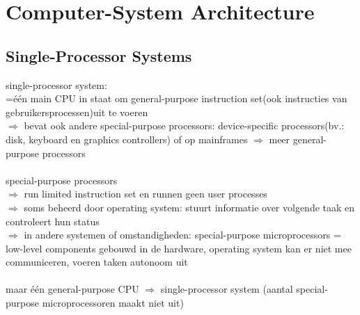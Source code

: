 \documentclass{report}
\begin{document}
\section{Computer-System Architecture}
\subsection{Single-Processor Systems}
single-processor system:
\\=\'e\'en main CPU in staat om general-purpose instruction set(ook instructies van gebruikersprocessen)uit te voeren
\\$\Rightarrow$ bevat ook andere special-purpose processors: device-specific processors(bv.: disk, keyboard en graphics controllers) of op mainframes $\Rightarrow$ meer general-purpose processors
\\
\\special-purpose processors 
\\$\Rightarrow$ run limited instruction set en runnen geen user processes
\\$\Rightarrow$ soms beheerd door operating system: stuurt informatie over volgende taak en controleert hun status
\\$\Rightarrow$ in andere systemen of omstandigheden: special-purpose microprocessors = low-level components gebouwd in de hardware, operating system kan er niet mee communiceren, voeren taken autonoom uit
\\
\\ maar \'e\'en general-purpose CPU $\Rightarrow$ single-processor system (aantal special-purpose microprocessoren maakt niet uit)
\end{document}
